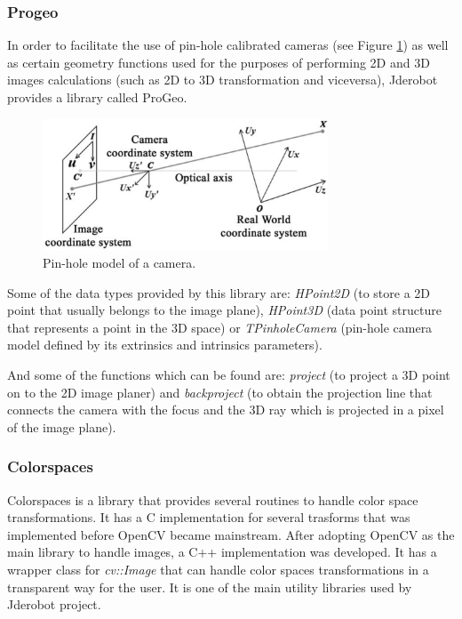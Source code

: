 \documentclass[twocolumn]{svjour3}          %
\begin{document}
\subsubsection{Progeo}
\label{subsec:progeo}

In order to facilitate the use of pin-hole calibrated cameras (see Figure \ref{fig:pinholemodel}) as well as certain geometry functions used for the purposes of performing 2D and 3D images calculations (such as 2D to 3D transformation and viceversa), Jderobot provides a library called ProGeo.

\begin{figure}[h!]
  \includegraphics[width=8.5cm]{figs/pinholemodel.png}
\caption{Pin-hole model of a camera.}
\label{fig:pinholemodel}
\end{figure}

Some of the data types provided by this library are: \textit{HPoint2D} (to store a 2D point that usually belongs to the image plane), \textit{HPoint3D} (data point structure that represents a point in the 3D space) or \textit{TPinholeCamera} (pin-hole camera model defined by its extrinsics and intrinsics parameters).

And some of the functions which can be found are: \textit{project} (to project a 3D point on to the 2D image planer) and \textit{backproject} (to obtain the projection line that connects the camera with the focus and the 3D ray which is projected in a pixel of the image plane).

\subsubsection{Colorspaces}
\label{subsec:colorspaces}
Colorspaces is a library that provides several routines to handle color space transformations. It has a C implementation for several trasforms that was implemented before OpenCV became mainstream. After adopting OpenCV as the main library to handle images, a C++ implementation was developed. It has a wrapper class for \textit{cv::Image} that can handle color spaces transformations in a transparent way for the user. It is one of the main utility libraries used by Jderobot project.
\end{document}
